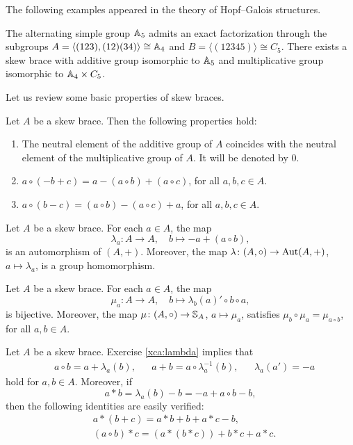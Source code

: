 The following examples appeared in the theory of 
Hopf--Galois structures.

\begin{example} 
	\label{exa:a5a4c5}
	The alternating simple group $\mathbb{A}_5$ admits an exact factorization
  through the subgroups 
  $A=\langle (123),(12)(34)\rangle\cong\mathbb{A}_4$ and 
  $B=\langle(12345)\rangle\cong C_5$.  
  There exists a skew brace with additive group isomorphic to $\mathbb{A}_5$ and multiplicative
  group isomorphic to $\mathbb{A}_4\times C_5$. 
\end{example}

Let us review some basic properties of skew braces. 

\begin{exercise}
\label{xca:0=1}
Let $A$ be a skew brace. Then the following properties hold:
\begin{enumerate}
    \item The neutral element of the additive group of $A$ coincides with 
    the neutral element of the multiplicative group of $A$. It will be denoted
    by $0$. 
    \item $a\circ(-b+c)=a-(a\circ b)+(a\circ c)$, for all $a,b,c\in A$.
    \item $a\circ(b-c)=(a\circ b)-(a\circ c)+a$, for all $a,b,c\in A$.
\end{enumerate}
\end{exercise}

\begin{exercise}
\label{xca:lambda}
    Let $A$ be a skew brace. For each $a\in A$, the map
    \[
        \lambda_a\colon A\to A,\quad
        b\mapsto -a+(a\circ b),
    \]
    is an automorphism of $(A,+)$. Moreover, the map 
    $\lambda\colon (A,\circ)\to\operatorname{Aut}(A,+)$, $a\mapsto\lambda_a$, is a group homomorphism. 
\end{exercise}

\begin{exercise}
\label{xca:mu}
    Let $A$ be a skew brace. For each $a\in A$, the map
    \[
        \mu_a\colon A\to A,\quad
        b\mapsto \lambda_b(a)'\circ b\circ a,
    \]
    is bijective. Moreover, the map 
    $\mu\colon (A,\circ)\to\mathbb{S}_A$, $a\mapsto\mu_a$, satisfies $\mu_b\circ\mu_a=\mu_{a\circ b}$, for all $a,b\in A$. 
\end{exercise}

Let $A$ be a skew brace. 
Exercise \ref{xca:lambda} implies that 
\begin{align}
\label{eq:formulas}
&a\circ b = a+\lambda_a(b),
&&a+b=a\circ \lambda^{-1}_a(b),
&&\lambda_a(a')=-a
\end{align}
hold for $a,b\in A$. Moreover, if 
\[
    a*b=\lambda_a(b)-b=-a+a\circ b-b,
\]
then the following identities are easily verified:
\begin{align}
&a*(b+c)=a*b+b+a*c-b,\\
&(a\circ b)*c=(a*(b*c))+b*c+a*c.
\end{align}

